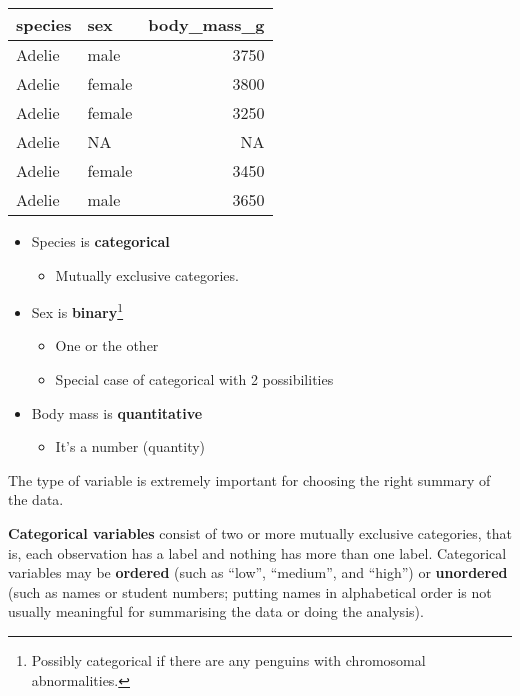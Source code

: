 \documentclass[
  letterpaper,
  DIV=11,
  numbers=noendperiod]{scrreprt}
\providecommand{\tightlist}{%
  \setlength{\itemsep}{0pt}\setlength{\parskip}{0pt}}\usepackage{longtable,booktabs,array}
\begin{document}
\begin{longtable}[]{@{}llr@{}}
\toprule\noalign{}
species & sex & body\_mass\_g \\
\midrule\noalign{}
\endhead
\bottomrule\noalign{}
\endlastfoot
Adelie & male & 3750 \\
Adelie & female & 3800 \\
Adelie & female & 3250 \\
Adelie & NA & NA \\
Adelie & female & 3450 \\
Adelie & male & 3650 \\
\end{longtable}

\begin{itemize}
\tightlist
\item
  Species is \textbf{categorical}

  \begin{itemize}
  \tightlist
  \item
    Mutually exclusive categories.
  \end{itemize}
\item
  Sex is \textbf{binary}\footnote{Possibly categorical if there are any
    penguins with chromosomal abnormalities.}

  \begin{itemize}
  \tightlist
  \item
    One or the other
  \item
    Special case of categorical with 2 possibilities
  \end{itemize}
\item
  Body mass is \textbf{quantitative}

  \begin{itemize}
  \tightlist
  \item
    It's a number (quantity)
  \end{itemize}
\end{itemize}

The type of variable is extremely important for choosing the right
summary of the data.

\textbf{Categorical variables} consist of two or more mutually exclusive
categories, that is, each observation has a label and nothing has more
than one label. Categorical variables may be \textbf{ordered} (such as
``low'', ``medium'', and ``high'') or \textbf{unordered} (such as names
or student numbers; putting names in alphabetical order is not usually
meaningful for summarising the data or doing the analysis).
\end{document}
